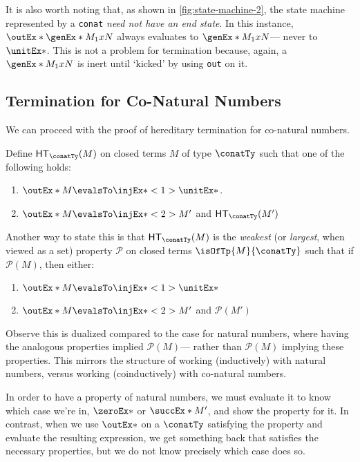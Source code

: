 \documentclass[letterpaper]{article}
\begin{document}
It is also worth noting that, as shown in \ref{fig:state-machine-2}, the state
machine represented by a \texttt{conat} \textit{need not have an end state}. In
this instance, $\outEx*{\genEx*{M_1}{x}{N}}$ always evaluates to
$\genEx*{M_1}{x}{N}$--- never to $\unitEx*$. This is not a problem for
termination because, again, a $\genEx*{M_1}{x}{N}$ is inert until `kicked' by
using \texttt{out} on it.

\subsection{Termination for Co-Natural Numbers}

We can proceed with the proof of hereditary termination for co-natural numbers.

\begin{definition}
    Define $\HT[\conatTy](M)$ on closed terms $M$ of type $\conatTy$ such that
    one of the following holds:
    \begin{enumerate}
        \item $\outEx*{M} \evalsTo \injEx*<1>{\unitEx*}$.
        \item $\outEx*{M} \evalsTo \injEx*<2>{M'}$ and $\HT[\conatTy](M')$
    \end{enumerate}
\end{definition}

Another way to state this is that $\HT[\conatTy](M)$ is the \textit{weakest}
(or \textit{largest}, when viewed as a set) property $\mathcal{P}$ on closed
terms $\isOfTp{M}{\conatTy}$ such that if $\mathcal{P}(M)$, then either:

\begin{enumerate}
    \item $\outEx*{M} \evalsTo \injEx*<1>{\unitEx*}$
    \item $\outEx*{M} \evalsTo \injEx*<2>{M'}$ and $\mathcal{P}(M')$
\end{enumerate}

Observe this is dualized compared to the case for natural numbers, where having
the analogous properties implied $\mathcal{P}(M)$--- rather than
$\mathcal{P}(M)$ implying these properties. This mirrors the structure of
working (inductively) with natural numbers, versus working (coinductively) with
co-natural numbers.

In order to have a property of natural numbers, we must
evaluate it to know which case we're in, $\zeroEx*$ or $\succEx*{M'}$, and show
the property for it. In contrast, when we use $\outEx*$ on a $\conatTy$
satisfying the property and evaluate the resulting expression, we get something
back that satisfies the necessary properties, but we do not know precisely
which case does so.
\end{document}

